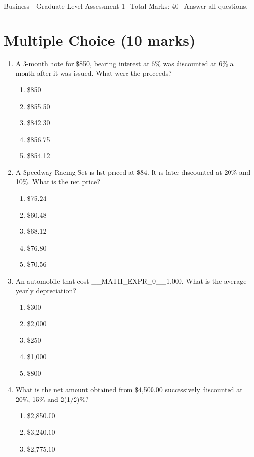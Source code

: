 \documentclass[12pt]{article}
\begin{document}
\begin{center}
Business - Graduate Level Assessment 1 \
Total Marks: 40 \
Answer all questions.
\end{center}

\section*{Multiple Choice (10 marks)}
\begin{enumerate}[label=\arabic*.]
\item A 3-month note for \$850, bearing interest at 6\% was discounted at 6\% a month after it was issued. What were the proceeds?
\begin{enumerate}[label=(\alph*)]
    \item \$850
    \item \$855.50
    \item \$842.30
    \item \$856.75
    \item \$854.12
\end{enumerate}
\item A Speedway Racing Set is list-priced at \$84. It is later discounted at 20\% and 10\%. What is the net price?
\begin{enumerate}[label=(\alph*)]
    \item \$75.24
    \item \$60.48
    \item \$68.12
    \item \$76.80
    \item \$70.56
\end{enumerate}
\item An automobile that cost \_\_MATH\_EXPR\_0\_\_1,000. What is the average yearly depreciation?
\begin{enumerate}[label=(\alph*)]
    \item \$300
    \item \$2,000
    \item \$250
    \item \$1,000
    \item \$800
\end{enumerate}
\item What is the net amount obtained from \$4,500.00 successively discounted at 20\%, 15\% and 2(1/2)\%?
\begin{enumerate}[label=(\alph*)]
    \item \$2,850.00
    \item \$3,240.00
    \item \$2,775.00

\end{enumerate}
\end{enumerate}
\end{document}
